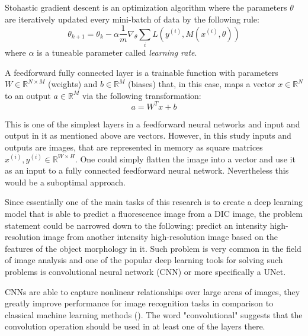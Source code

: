 \begin{definition}
	Stohastic gradient descent is an optimization algorithm where the parameters $\theta$ are iteratively updated every mini-batch of data by the following rule:
	\begin{equation}
		\theta_{k+1} = \theta_k - \alpha \frac{1}{m} \nabla_\theta \sum_{i} L(y^{(i)}, M(x^{(i)}, \theta))
	\end{equation}
	where $\alpha$ is a tuneable parameter called \textit {learning rate}.
\end{definition}

\begin{definition}
	A feedforward fully connected layer is a trainable function with parameters $W \in \mathbb{R}^{N \times M}$ (weights) and $b \in \mathbb{R}^{M}$ (biases) that, in this case, maps a vector $x \in \mathbb{R}^{N}$ to an output $a \in \mathbb{R}^{M}$ via the following transformation:
		\begin{equation}
			a = W^{T}x + b
		\end{equation}
\end{definition}

This is one of the simplest layers in a feedforward neural networks and input and output in it as mentioned above are vectors. However, in this study inputs and outputs are images, that are represented in memory as square matrices $x^{(i)}, y^{(i)} \in \mathbb{R}^{W \times H}$. One could simply flatten the image into a vector and use it as an input to a fully connected feedforward neural network. Nevertheless this would be a suboptimal approach. 

Since essentially one of the main tasks of this research is to create a deep learning model that is able to predict a fluorescence image from a DIC image, the problem statement could be narrowed down to the following: predict an intensity high-resolution image from another intensity high-resolution image based on the features of the object morphology in it. Such problem is very common in the field of image analysis and one of the popular deep learning tools for solving such problems is convolutional neural network (CNN) or more specifically a UNet.

CNNs are able to capture nonlinear relationships over large areas of images, they greatly improve performance for image recognition tasks in comparison to classical machine learning methods (\cite{Ounkomol_2018}). The word "convolutional" suggests that the convolution operation should be used in at least one of the layers there.  

